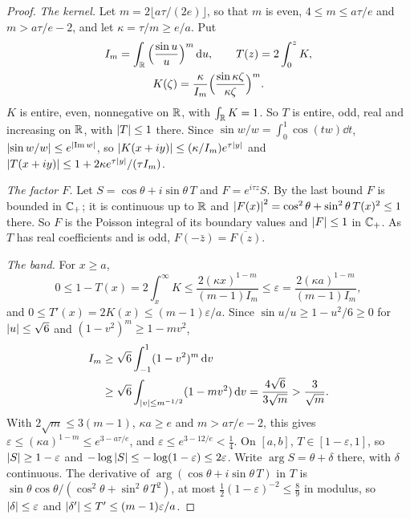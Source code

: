 \begin{proof}
\emph{The kernel.} Let $m=2\lfloor a\tau/(2e)\rfloor$, so that $m$ is even,
$4\le m\le a\tau/e$ and $m>a\tau/e-2$, and let $\kappa=\tau/m\ge e/a$. Put
\begin{gather*}
I_m=\int_\mathbb R\Big(\frac{\sin u}u\Big)^m\,\mathrm d u,\qquad
T(z)=2\int_0^zK,\\
K(\zeta)=\frac\kappa{I_m}\Big(\frac{\sin\kappa\zeta}{\kappa\zeta}\Big)^m .
\end{gather*}
$K$ is entire, even, nonnegative on $\mathbb R$, with $\int_\mathbb R K=1$. So $T$ is entire,
odd, real and increasing on $\mathbb R$, with $\left|T\right|\le1$ there. Since
$\sin w/w=\int_0^1\cos(tw)\dd t$, $\left|\sin w/w\right|\le e^{\left|\operatorname{Im} w\right|}$, so
$\left|K(x+iy)\right|\le(\kappa/I_m)e^{\tau\left|y\right|}$ and
$\left|T(x+iy)\right|\le1+2\kappa e^{\tau\left|y\right|}/(\tau I_m)$.

\emph{The factor $F$.} Let $S=\cos\theta+i\sin\theta\,T$ and $F=e^{i\tau z}S$.
By the last bound $F$ is bounded in $\mathbb C_{+}$; it is continuous up to $\mathbb R$ and
$\left|F(x)\right|^2=\cos^2\theta+\sin^2\theta\,T(x)^2\le1$ there. So $F$ is the
Poisson integral of its boundary values and $\left|F\right|\le1$ in $\mathbb C_{+}$. As $T$ has
real coefficients and is odd, $F(-\bar z)=\overline{F(z)}$.

\emph{The band.} For $x\ge a$,
\[
0\le1-T(x)=2\int_x^\infty K\le\frac{2(\kappa x)^{1-m}}{(m-1)I_m}\le\varepsilon
=\frac{2(\kappa a)^{1-m}}{(m-1)I_m},
\]
and $0\le T'(x)=2K(x)\le(m-1)\varepsilon/a$. Since $\sin u/u\ge1-u^2/6\ge0$ for
$\left|u\right|\le\sqrt6$ and $(1-v^2)^m\ge1-mv^2$,
\begin{align*}
I_m&\ge\sqrt6\int_{-1}^1(1-v^2)^m\,\mathrm d v\\
&\ge\sqrt6\int_{\left|v\right|\le m^{-1/2}}(1-mv^2)\,\mathrm d v
=\frac{4\sqrt6}{3\sqrt m}>\frac3{\sqrt m} .
\end{align*}
With $2\sqrt m\le3(m-1)$, $\kappa a\ge e$ and $m>a\tau/e-2$, this gives
$\varepsilon\le(\kappa a)^{1-m}\le e^{3-a\tau/e}$, and $\varepsilon\le e^{3-12/e}<\frac14$.
On $[a,b]$, $T\in[1-\varepsilon,1]$, so $\left|S\right|\ge1-\varepsilon$ and
$-\log\left|S\right|\le-\log(1-\varepsilon)\le2\varepsilon$. Write
$\arg S=\theta+\delta$ there, with $\delta$ continuous. The derivative of
$\arg(\cos\theta+i\sin\theta\,T)$ in $T$ is
$\sin\theta\cos\theta/(\cos^2\theta+\sin^2\theta\,T^2)$, at most
$\frac12(1-\varepsilon)^{-2}\le\frac89$ in modulus, so $\left|\delta\right|\le\varepsilon$ and
$\left|\delta'\right|\le T'\le(m-1)\varepsilon/a$.


\end{proof}
